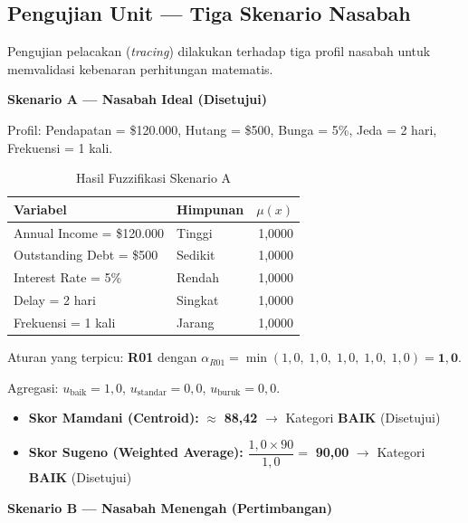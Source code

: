 \documentclass[12pt,a4paper]{report}
\begin{document}
\subsection{Pengujian Unit — Tiga Skenario Nasabah}

Pengujian pelacakan (\textit{tracing}) dilakukan terhadap tiga
profil nasabah untuk memvalidasi kebenaran perhitungan matematis.

\vspace{6pt}
\noindent\textbf{Skenario A — Nasabah Ideal (Disetujui)}

\noindent Profil: Pendapatan = \$120.000, Hutang = \$500,
Bunga = 5\%, Jeda = 2 hari, Frekuensi = 1 kali.

\begin{table}[H]
  \centering
  \caption{Hasil Fuzzifikasi Skenario A}
  \label{tab:fuzz_a}
  \small
  \renewcommand{\arraystretch}{1.2}
  \begin{tabular}{|l|l|r|}
    \hline
    \textbf{Variabel} & \textbf{Himpunan} & \textbf{$\mu(x)$} \\
    \hline
    Annual Income   = \$120.000 & Tinggi  & 1,0000 \\
    Outstanding Debt = \$500    & Sedikit & 1,0000 \\
    Interest Rate   = 5\%       & Rendah  & 1,0000 \\
    Delay           = 2 hari    & Singkat & 1,0000 \\
    Frekuensi       = 1 kali    & Jarang  & 1,0000 \\
    \hline
  \end{tabular}
\end{table}

Aturan yang terpicu: \textbf{R01} dengan $\alpha_{R01} =
\min(1{,}0,\; 1{,}0,\; 1{,}0,\; 1{,}0,\; 1{,}0) = \mathbf{1{,}0}$.

Agregasi: $u_{\text{baik}} = 1{,}0$,\;
$u_{\text{standar}} = 0{,}0$,\;
$u_{\text{buruk}} = 0{,}0$.

\begin{itemize}
  \item \textbf{Skor Mamdani (Centroid):} $\approx$ \textbf{88,42}
        $\rightarrow$ Kategori \textbf{BAIK} (Disetujui)
  \item \textbf{Skor Sugeno (Weighted Average):}
        $\dfrac{1{,}0 \times 90}{1{,}0} = $ \textbf{90,00}
        $\rightarrow$ Kategori \textbf{BAIK} (Disetujui)
\end{itemize}

\vspace{8pt}
\noindent\textbf{Skenario B — Nasabah Menengah (Pertimbangan)}
\end{document}
